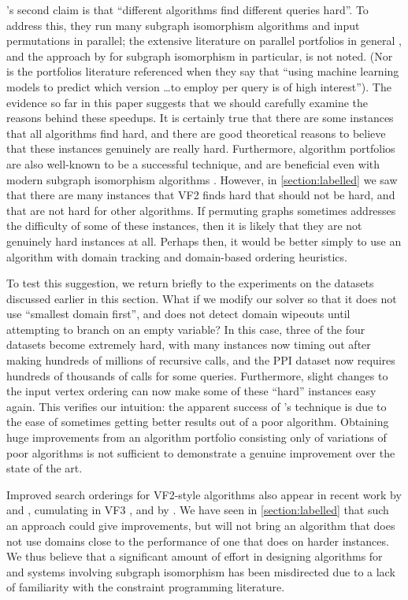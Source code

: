 \documentclass[twoside,11pt]{article}
\begin{document}
's second claim is that ``different
algorithms find different queries hard''. To address this, they run many subgraph isomorphism
algorithms and input permutations in parallel; the extensive literature on parallel portfolios in
general \cite{DBLP:journals/ai/GomesS01}, and the approach by  for
subgraph isomorphism in particular, is not noted. (Nor is the portfolios literature referenced when
they say that ``using machine learning models to predict which version \ldots to employ per query is
of high interest'').  The evidence so far in this paper suggests that we should carefully examine
the reasons behind these speedups. It is certainly true that there are some instances that all
algorithms find hard, and there are good theoretical reasons to believe that these instances
genuinely are really hard.  Furthermore, algorithm portfolios are also well-known to be a successful
technique, and are beneficial even with modern subgraph isomorphism algorithms
\cite{DBLP:conf/lion/KotthoffMS16}.  However, in \cref{section:labelled} we saw that there are many
instances that VF2 finds hard that should not be hard, and that are not hard for other algorithms.
If permuting graphs sometimes addresses the difficulty of some of these instances, then it is likely
that they are not genuinely hard instances at all. Perhaps then, it would be better simply to use an
algorithm with domain tracking and domain-based ordering heuristics.

To test this suggestion, we return briefly to the experiments on the datasets discussed earlier in
this section. What if we modify our solver so that it does not use ``smallest domain first'', and
does not detect domain wipeouts until attempting to branch on an empty variable?  In this case, three of
the four datasets become extremely hard, with many instances now timing out after making hundreds of
millions of recursive calls, and the PPI dataset now requires hundreds of thousands of calls for
some queries.  Furthermore, slight changes to the input vertex ordering can now make some of these
``hard'' instances easy again.  This verifies our intuition: the apparent success of
's technique is due to the ease of sometimes getting better
results out of a poor algorithm. Obtaining huge improvements from an algorithm portfolio consisting
only of variations of poor algorithms is not sufficient to demonstrate a genuine improvement over
the state of the art.

Improved search orderings for VF2-style algorithms also appear in recent work by
 and , cumulating in VF3
\cite{DBLP:conf/gbrpr/CarlettiFSV17,o:CarlettiFSV17}, and by . We
have seen in \cref{section:labelled} that such an approach could give improvements, but will not
bring an algorithm that does not use domains close to the performance of one that does on harder
instances.  We thus believe that a significant amount of effort in designing algorithms for and
systems involving subgraph isomorphism has been misdirected due to a lack of familiarity with the
constraint programming literature.
\end{document}
